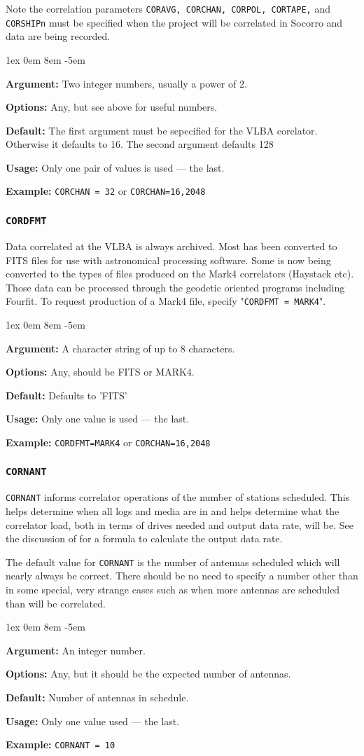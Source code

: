 \documentclass{report}
\newcommand{\rcwbox}[5]{
  \begin{list}{}{\parsep 1ex  \itemsep 0em
                 \leftmargin 8em  \itemindent -5em }
    \item {\bf Argument:} #1
    \item {\bf Options:}  #2
    \item {\bf Default:}  #3
    \item {\bf Usage:}    #4
    \item {\bf Example:}  #5
  \end{list}
}
\begin{document}
Note the correlation parameters {\tt CORAVG, CORCHAN,
CORPOL, CORTAPE,} and {\tt CORSHIPn} must be specified when
the project will be correlated in Socorro and data
are being recorded.

\rcwbox
{Two integer numbers, usually a power of 2.}
{Any, but see above for useful numbers.}
{The first argument must be sepecified for the VLBA corelator.
Otherwise it defaults to 16.  The second argument defaults 128}
{Only one pair of values is used --- the last.}
{{\tt CORCHAN = 32} or {\tt CORCHAN=16,2048}}


\subsubsection{\label{MP:CORDFMT}{\tt CORDFMT}}

Data correlated at the VLBA is always archived.  Most has been
converted to FITS files for use with astronomical processing software.
Some is now being converted to the types of files produced on the
Mark4 correlators (Haystack etc).  Those data can be processed through
the geodetic oriented programs including Fourfit.  To request production
of a Mark4 file, specify "{\tt CORDFMT = MARK4}".

\rcwbox
{A character string of up to 8 characters.}
{Any, should be FITS or MARK4.}
{Defaults to 'FITS'}
{Only one value is used --- the last.}
{{\tt CORDFMT=MARK4} or {\tt CORCHAN=16,2048}}


\subsubsection{\label{MP:CORNANT}{\tt CORNANT}}

{\tt CORNANT} informs correlator operations of the number of stations
scheduled.  This helps determine when all logs and media are in and
helps determine what the correlator load, both in terms of drives
needed and output data rate, will be.  See the discussion of
 for a formula to calculate
the output data rate.

The default value for {\tt CORNANT} is the number of antennas scheduled
which will nearly always be correct.  There should be no need to specify
a number other than in some special, very strange cases such as when more
antennas are scheduled than will be correlated.

\rcwbox
{An integer number.}
{Any, but it should be the expected number of antennas.}
{Number of antennas in schedule.}
{Only one value used --- the last.}
{{\tt CORNANT = 10}}
\end{document}
